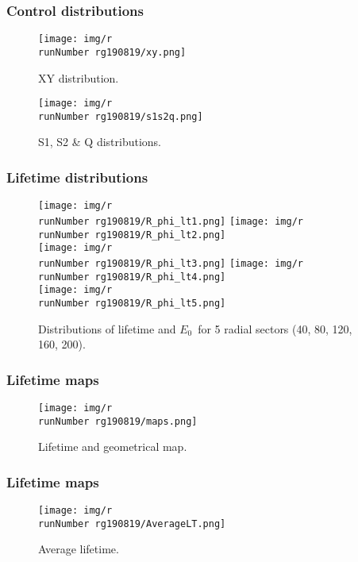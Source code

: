 \begin{frame}
\frametitle{Control distributions}
\begin{figure}
  \begin{center}
      \texttt{[image: img/r\\runNumber rg190819/xy.png]}
    \caption{XY distribution.}
  \end{center}
\end{figure}
\end{frame}

\begin{frame}
\begin{figure}
  \begin{center}
      \texttt{[image: img/r\\runNumber rg190819/s1s2q.png]}
    \caption{S1, S2 \& Q distributions.}
  \end{center}
\end{figure}
\end{frame}

\begin{frame}
\frametitle{Lifetime distributions}
\begin{figure}
  \begin{center}
      \texttt{[image: img/r\\runNumber rg190819/R\_phi\_lt1.png]}
      \texttt{[image: img/r\\runNumber rg190819/R\_phi\_lt2.png]} \\
      \texttt{[image: img/r\\runNumber rg190819/R\_phi\_lt3.png]}
      \texttt{[image: img/r\\runNumber rg190819/R\_phi\_lt4.png]}\\
      \texttt{[image: img/r\\runNumber rg190819/R\_phi\_lt5.png]}
    \caption{Distributions of lifetime and $E_0$~for 5 radial sectors (40, 80, 120, 160, 200).}
  \end{center}
\end{figure}
\end{frame}

\begin{frame}
\frametitle{Lifetime maps}
\begin{figure}
  \begin{center}
      \texttt{[image: img/r\\runNumber rg190819/maps.png]}
    \caption{Lifetime and geometrical map.}
  \end{center}
\end{figure}
\end{frame}

\begin{frame}
\frametitle{Lifetime maps}
\begin{figure}
  \begin{center}
      \texttt{[image: img/r\\runNumber rg190819/AverageLT.png]}
    \caption{Average lifetime.}
  \end{center}
\end{figure}
\end{frame}

